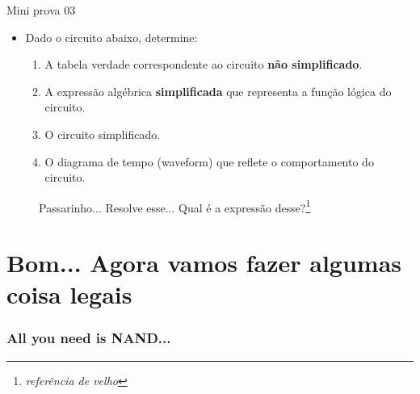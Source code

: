 \begin{frame}{Mini prova 03}
	\begin{itemize}
		\item Dado o circuito abaixo, determine:
		\begin{enumerate}
			\item A tabela verdade correspondente ao circuito \textbf{não simplificado}.
			\item A expressão algébrica \textbf{simplificada} que representa a função lógica do circuito.
			\item O circuito simplificado.
			\item O diagrama de tempo (waveform) que reflete o comportamento do circuito.
		\end{enumerate}
	\end{itemize}
	\begin{figure}
		\centering
		
		\caption{Passarinho... Resolve esse... Qual é a expressão desse?\footnote[frame]{\textit{referência de velho}}}
		\label{fig:05exe}
	\end{figure}
\end{frame}

\section{Bom... Agora vamos fazer algumas coisa legais}

\begin{frame}
	\frametitle{\musEighth All you need is NAND... \musEighth}
	
\end{frame}
